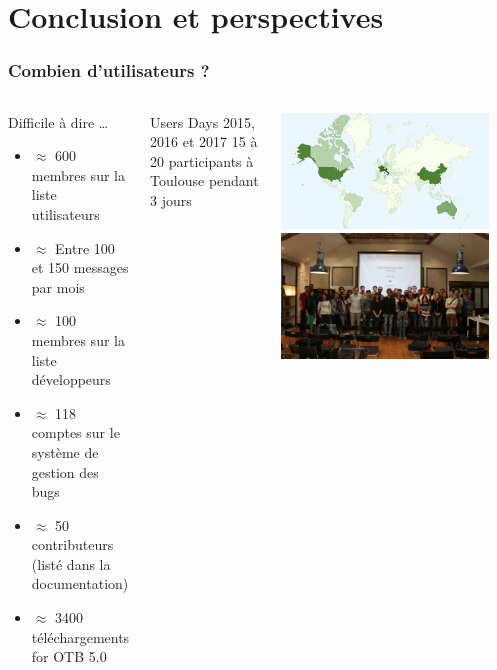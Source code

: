 \documentclass[8pt]{beamer}
\begin{document}
\section{Conclusion et perspectives}
\begin{frame}
\frametitle{Combien d'utilisateurs ?}
\begin{columns}[c]
\begin{block}{Difficile à dire \ldots}
\begin{itemize}
    \item $\approx$ 600 membres sur la liste utilisateurs
    \item $\approx$ Entre 100 et 150 messages par mois
    \item $\approx$ 100 membres sur la liste développeurs
    \item $\approx$ 118 comptes sur le système de gestion des bugs
    \item $\approx$ 50 contributeurs (listé dans la documentation)
    \item $\approx$ 3400 téléchargements for OTB 5.0
  \end{itemize}
\end{block}
\begin{block}{Users Days 2015, 2016 et 2017}
  15 à 20 participants à Toulouse pendant 3 jours
\end{block}
\includegraphics[width=0.9\textwidth]{images/OTB4_download_sourceforge_country_crop.png}\\
\includegraphics[width=0.9\textwidth]{images/userdays2017.jpg}
\end{columns}

\end{frame}
\end{document}
